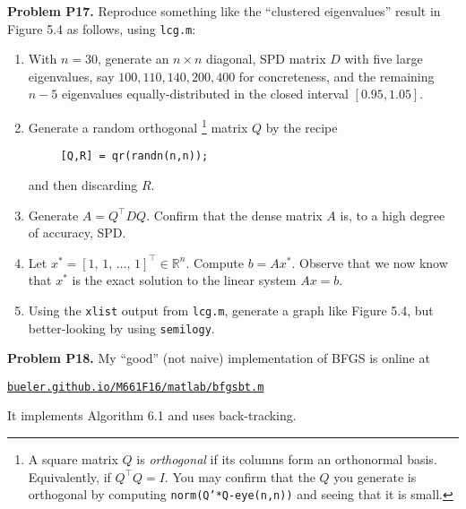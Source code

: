 \documentclass[12pt]{amsart}
\newcommand{\RR}{\mathbb{R}}
\newcommand{\prob}[1]{\medskip\noindent\textbf{#1.}\quad }
\begin{document}
\newpage
\prob{Problem P17}  Reproduce something like the ``clustered eigenvalues'' result in Figure 5.4 as follows, using \texttt{lcg.m}:\renewcommand{\labelenumi}{\emph{\roman{enumi})}} \begin{enumerate}
\item With $n=30$, generate an $n \times n$ diagonal, SPD matrix $D$ with five large eigenvalues, say $100,110,140,200,400$ for concreteness, and the remaining $n-5$ eigenvalues equally-distributed in the closed interval $[0.95,1.05]$.
\item Generate a random orthogonal \footnote{A square matrix $Q$ is \emph{orthogonal} if its columns form an orthonormal basis.  Equivalently, if $Q^\top Q = I$.  You may confirm that the $Q$ you generate is orthogonal by computing \texttt{norm(Q'*Q-eye(n,n))} and seeing that it is small.} matrix $Q$ by the recipe
\begin{Verbatim}
     [Q,R] = qr(randn(n,n));
\end{Verbatim}
and then discarding $R$.
\item Generate $A = Q^\top D Q$.  Confirm that the dense matrix $A$ is, to a high degree of accuracy, SPD.
\item Let $x^* = [1,\,1,\,\dots,\,1]^\top \in \RR^n$.  Compute $b = A x^*$.  Observe that we now know that $x^*$ is the exact solution to the linear system $A x = b$.
\item Using the \texttt{xlist} output from \texttt{lcg.m}, generate a graph like Figure 5.4, but better-looking by using \texttt{semilogy}.
\end{enumerate}

\begin{comment} SOLUTION
n = 30;
D = diag([100, 110, 140, 200, 400, linspace(0.95,1.05,n-5)]);
[Q,R] = qr(randn(n));
norm(Q'*Q-eye(n))
A = Q'*D*Q;
norm(A-A')
xstar = ones(n,1);
b = A * xstar;
[x xlist]=lcg(zeros(n,1),A,b,1.0e-13,12)
KK=size(xlist,2);  err = ones(1,KK);
for k=1:KK
    err(k) = (xlist(:,k)-xstar)' * A * (xlist(:,k)-xstar);
end
semilogy(1:KK,err,'o-')
\end{comment}

\bigskip

\prob{Problem P18}  My ``good'' (not naive) implementation of BFGS is online at

\medskip

\centerline{\href{http://bueler.github.io/M661F16/matlab/bfgsbt.m}{\texttt{bueler.github.io/M661F16/matlab/bfgsbt.m}}}

\medskip
\noindent It implements Algorithm 6.1 and uses back-tracking.
\end{document}
